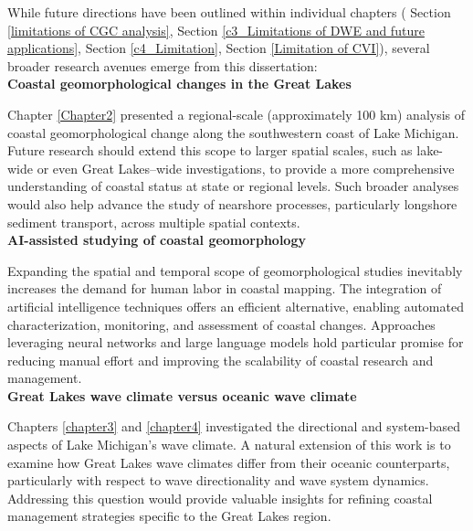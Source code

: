 While future directions have been outlined within individual chapters (\eg
Section \ref{limitations of CGC analysis}, Section \ref{c3_Limitations of DWE
and future applications}, Section \ref{c4_Limitation}, Section \ref{Limitation
of CVI}), several broader research avenues emerge from this dissertation: \\
\textbf{Coastal geomorphological changes in the Great Lakes}  

Chapter \ref{Chapter2} presented a regional-scale (approximately 100 km)
analysis of coastal geomorphological change along the southwestern coast of Lake
Michigan. Future research should extend this scope to larger spatial scales,
such as lake-wide or even Great Lakes–wide investigations, to provide a more
comprehensive understanding of coastal status at state or regional levels. Such
broader analyses would also help advance the study of nearshore processes,
particularly longshore sediment transport, across multiple spatial contexts.\\
\textbf{AI-assisted studying of coastal geomorphology}  

Expanding the spatial and temporal scope of geomorphological studies inevitably
increases the demand for human labor in coastal mapping. The integration of
artificial intelligence techniques offers an efficient alternative, enabling
automated characterization, monitoring, and assessment of coastal changes.
Approaches leveraging neural networks and large language models hold particular
promise for reducing manual effort and improving the scalability of coastal
research and management.\\
\textbf{Great Lakes wave climate versus oceanic wave climate}  

Chapters \ref{chapter3} and \ref{chapter4} investigated the directional and
system-based aspects of Lake Michigan’s wave climate. A natural extension of
this work is to examine how Great Lakes wave climates differ from their oceanic
counterparts, particularly with respect to wave directionality and wave system
dynamics. Addressing this question would provide valuable insights for refining
coastal management strategies specific to the Great Lakes region.  
